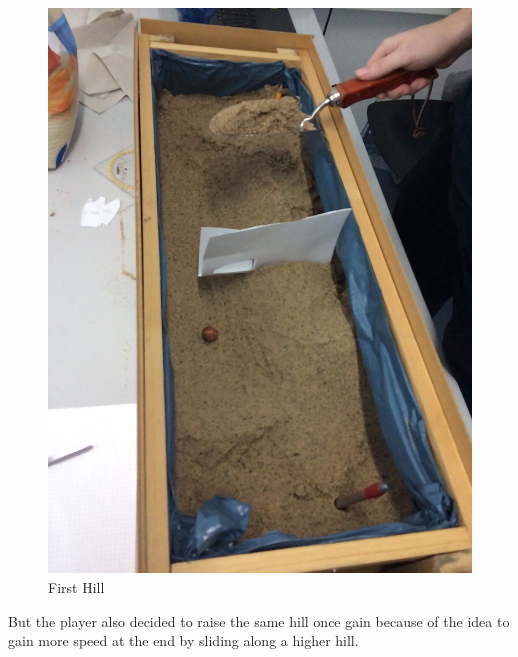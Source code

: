 \documentclass[12pt, letterpaper]{scrartcl}
\begin{document}
	\begin{figure}[H]
		\centering
		\includegraphics[scale=.2]{images/prototype/prototypeHill1}
		\caption{First Hill}
	\end{figure}
	But the player also decided to raise the same hill once gain because of the idea to gain more speed at the end by sliding along a higher hill.
\end{document}
